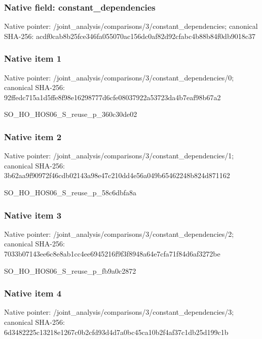 \documentclass[10pt,a4paper]{article}
\begin{document}
\subsubsection{Native field: constant\_\allowbreak{}dependencies}
Native pointer: /joint\_\allowbreak{}analysis/comparisons/3/constant\_\allowbreak{}dependencies; canonical SHA-256: acdf0cab8b25fce346fa055070ac156dc0af82d92cfabc4b88b84f0db9018c37

\subsubsection{Native item 1}
Native pointer: /joint\_\allowbreak{}analysis/comparisons/3/constant\_\allowbreak{}dependencies/0; canonical SHA-256: 92ffedc715a1d5ffe8f98e16298777d6cfe08037922a53723da4b7eaf98b67a2

\begingroup\raggedright\sloppy SO\_\allowbreak{}HO\_\allowbreak{}HOS06\_\allowbreak{}S\_\allowbreak{}reuse\_\allowbreak{}p\_\allowbreak{}360c30de02\par\endgroup

\subsubsection{Native item 2}
Native pointer: /joint\_\allowbreak{}analysis/comparisons/3/constant\_\allowbreak{}dependencies/1; canonical SHA-256: 3b62aa9f90972f46cdb02143a98e47c210dd4e56a049b65462248b824d871162

\begingroup\raggedright\sloppy SO\_\allowbreak{}HO\_\allowbreak{}HOS06\_\allowbreak{}S\_\allowbreak{}reuse\_\allowbreak{}p\_\allowbreak{}58c6dbfa8a\par\endgroup

\subsubsection{Native item 3}
Native pointer: /joint\_\allowbreak{}analysis/comparisons/3/constant\_\allowbreak{}dependencies/2; canonical SHA-256: 7033b07143ee6c8e8ab1cc4ee6945216f9f3f8948a64e7cfa71f84d6af3272be

\begingroup\raggedright\sloppy SO\_\allowbreak{}HO\_\allowbreak{}HOS06\_\allowbreak{}S\_\allowbreak{}reuse\_\allowbreak{}p\_\allowbreak{}fb9a0c2872\par\endgroup

\subsubsection{Native item 4}
Native pointer: /joint\_\allowbreak{}analysis/comparisons/3/constant\_\allowbreak{}dependencies/3; canonical SHA-256: 6d3482225c13218e1267c0b2cfd93d4d7a0bc45ca10b2f4af37c1db25d199c1b
\end{document}
